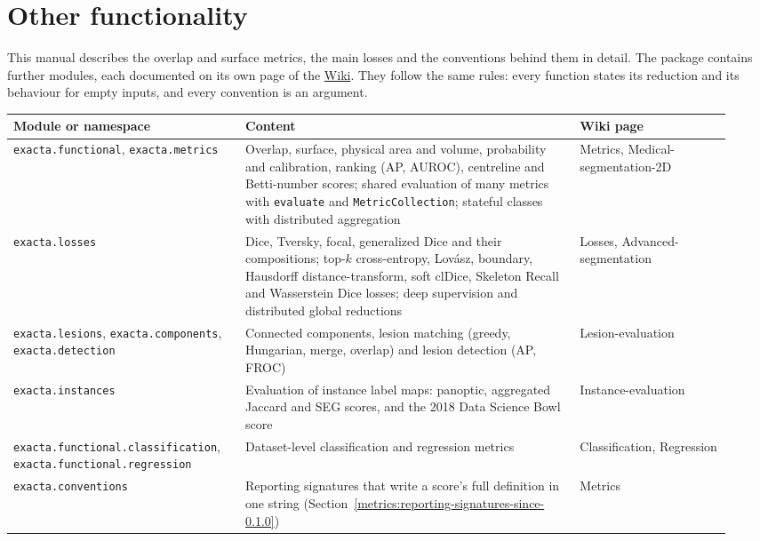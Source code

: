 \chapter{Other functionality}\label{ch:other}

This manual describes the overlap and surface metrics, the main losses and the conventions
behind them in detail. The package contains further modules, each documented on its own page
of the \href{https://github.com/rodolfo-viana/exacta/wiki}{Wiki}. They follow the same rules:
every function states its reduction and its behaviour for empty inputs, and every convention
is an argument.

\begin{longtable}{@{}
  >{\raggedright\arraybackslash}p{0.30\linewidth}
  >{\raggedright\arraybackslash}p{0.44\linewidth}
  >{\raggedright\arraybackslash}p{0.20\linewidth}@{}}
\toprule
Module or namespace & Content & Wiki page \\
\midrule
\endhead
\texttt{exacta.functional}, \texttt{exacta.metrics} &
Overlap, surface, physical area and volume, probability and calibration, ranking (AP,
AUROC), centreline and Betti-number scores; shared evaluation of many metrics with
\texttt{evaluate} and \texttt{MetricCollection}; stateful classes with distributed
aggregation &
Metrics, Medical-segmentation-2D \\
\texttt{exacta.losses} &
Dice, Tversky, focal, generalized Dice and their compositions; top-$k$ cross-entropy,
Lov\'asz, boundary, Hausdorff distance-transform, soft clDice, Skeleton Recall and
Wasserstein Dice losses; deep supervision and distributed global reductions &
Losses, Advanced-segmentation \\
\texttt{exacta.lesions}, \texttt{exacta.components}, \texttt{exacta.detection} &
Connected components, lesion matching (greedy, Hungarian, merge, overlap) and lesion
detection (AP, FROC) &
Lesion-evaluation \\
\texttt{exacta.instances} &
Evaluation of instance label maps: panoptic, aggregated Jaccard and SEG scores, and the 2018
Data Science Bowl score &
Instance-evaluation \\
\texttt{exacta.functional.}\allowbreak\texttt{classification}, \texttt{exacta.functional.}\allowbreak\texttt{regression} &
Dataset-level classification and regression metrics &
Classification, Regression \\
\texttt{exacta.conventions} &
Reporting signatures that write a score's full definition in one string (Section~\ref{metrics:reporting-signatures-since-0.1.0}) &
Metrics \\
\bottomrule
\end{longtable}
